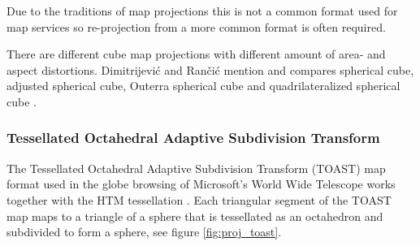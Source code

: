 Due to the traditions of map projections this is not a common format used for map services so re-projection from a more common format is often required.

There are different cube map projections with different amount of area- and aspect distortions. Dimitrijevi\'{c} and Ran\v{c}i\'{c} mention and compares spherical cube, adjusted spherical cube, Outerra spherical cube and quadrilateralized spherical cube \cite{dimi15}.

\subsubsection{Tessellated Octahedral Adaptive Subdivision Transform}

The Tessellated Octahedral Adaptive Subdivision Transform (TOAST) map format used in the globe browsing of Microsoft's World Wide Telescope works together with the HTM tessellation \cite{toast}. Each triangular segment of the TOAST map maps to a triangle of a sphere that is tessellated as an octahedron and subdivided to form a sphere, see figure \ref{fig:proj_toast}.


